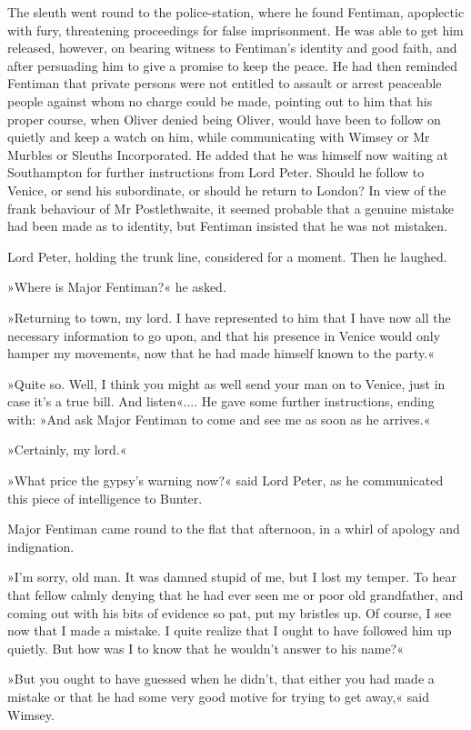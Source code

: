 The sleuth went round to the police-station, where he found Fentiman, apoplectic with fury, threatening proceedings for false imprisonment. He was able to get him released, however, on bearing witness to Fentiman's identity and good faith, and after persuading him to give a promise to keep the peace. He had then reminded Fentiman that private persons were not entitled to assault or arrest peaceable people against whom no charge could be made, pointing out to him that his proper course, when Oliver denied being Oliver, would have been to follow on quietly and keep a watch on him, while communicating with Wimsey or Mr Murbles or Sleuths Incorporated. He added that he was himself now waiting at Southampton for further instructions from Lord Peter. Should he follow to Venice, or send his subordinate, or should he return to London? In view of the frank behaviour of Mr Postlethwaite, it seemed probable that a genuine mistake had been made as to identity, but Fentiman insisted that he was not mistaken.

Lord Peter, holding the trunk line, considered for a moment. Then he laughed.

»Where is Major Fentiman?« he asked.

»Returning to town, my lord. I have represented to him that I have now all the necessary information to go upon, and that his presence in Venice would only hamper my movements, now that he had made himself known to the party.«

»Quite so. Well, I think you might as well send your man on to Venice, just in case it's a true bill. And listen«.... He gave some further instructions, ending with: »And ask Major Fentiman to come and see me as soon as he arrives.«

»Certainly, my lord.«

»What price the gypsy's warning now?« said Lord Peter, as he communicated this piece of intelligence to Bunter.

Major Fentiman came round to the flat that afternoon, in a whirl of apology and indignation.

»I'm sorry, old man. It was damned stupid of me, but I lost my temper. To hear that fellow calmly denying that he had ever seen me or poor old grandfather, and coming out with his bits of evidence so pat, put my bristles up. Of course, I see now that I made a mistake. I quite realize that I ought to have followed him up quietly. But how was I to know that he wouldn't answer to his name?«

»But you ought to have guessed when he didn't, that either you had made a mistake or that he had some very good motive for trying to get away,« said Wimsey.

